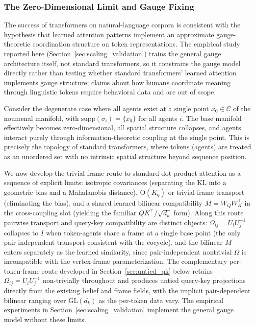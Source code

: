 \documentclass[11pt]{article}
\begin{document}
\subsubsection{The Zero-Dimensional Limit and Gauge Fixing}

The success of transformers on natural-language corpora is consistent with the hypothesis that learned attention patterns implement an approximate gauge-theoretic coordination structure on token representations. The empirical study reported here (Section~\ref{sec:scaling_validation}) trains the general gauge architecture itself, not standard transformers, so it constrains the gauge model directly rather than testing whether standard transformers' learned attention implements gauge structure; claims about how humans coordinate meaning through linguistic tokens require behavioral data and are out of scope.

Consider the degenerate case where all agents exist at a single point $x_0 \in \mathcal{C}$ of the noumenal manifold, with $\mathrm{supp}(\sigma_i) = \{x_0\}$ for all agents $i$. The base manifold effectively becomes zero-dimensional, all spatial structure collapses, and agents interact purely through information-theoretic coupling at the single point. This is precisely the topology of standard transformers, where tokens (agents) are treated as an unordered set with no intrinsic spatial structure beyond sequence position.

We now develop the trivial-frame route to standard dot-product attention as a sequence of explicit limits: isotropic covariances (separating the KL into a geometric bias and a Mahalanobis distance), $\mathrm{O}(K_q)$ or trivial-frame transport (eliminating the bias), and a shared learned bilinear compatibility $M = W_QW_K^\top$ in the cross-coupling slot (yielding the familiar $QK^\top/\sqrt{d_k}$ form). Along this route pairwise transport and query-key compatibility are distinct objects: $\Omega_{ij} = U_iU_j^{-1}$ collapses to $I$ when token-agents share a frame at a single base point (the only pair-independent transport consistent with the cocycle), and the bilinear $M$ enters separately as the learned similarity, since pair-independent nontrivial $\Omega$ is incompatible with the vertex-frame parameterization. The complementary per-token-frame route developed in Section~\ref{sec:untied_qk} below retains $\Omega_{ij} = U_iU_j^{-1}$ non-trivially throughout and produces untied query-key projections directly from the existing belief and frame fields, with the implicit pair-dependent bilinear ranging over $\mathrm{GL}(d_k)$ as the per-token data vary. The empirical experiments in Section~\ref{sec:scaling_validation} implement the general gauge model without these limits.
\end{document}
